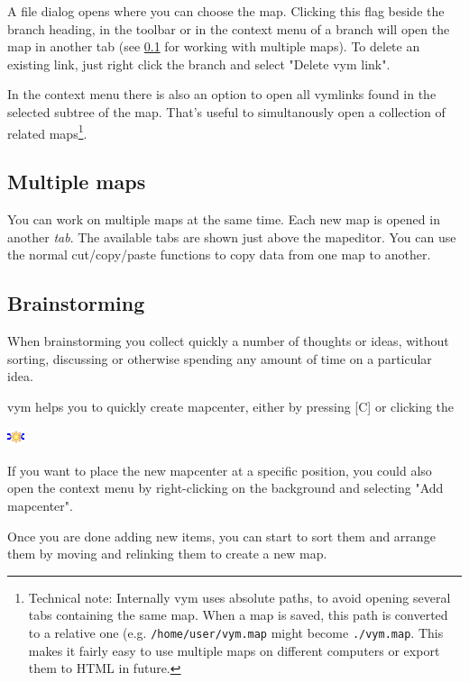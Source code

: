 \documentclass[12pt,a4paper]{article}
\newcommand{\vym}{{\sc vym }}
\newcommand{\key}[1]{[#1]}
\begin{document}
A file dialog opens where you can choose the map. 
Clicking this flag beside the branch heading, in the toolbar or in the
context menu of a branch will open the map in another tab (see
\ref{tabs} for working with multiple maps). To delete an existing link,
just right click the branch and select "Delete \vym link".

In the context menu there is also an option to open all vymlinks found
in the selected subtree of the map. That's useful to simultanously open
a collection of related maps\footnote{
    Technical note: Internally \vym uses absolute paths, to avoid
    opening several tabs containing the same map. When a map is saved,
    this path is converted to a relative one 
    (e.g. {\tt /home/user/vym.map} might become {\tt ./vym.map}. This
    makes it fairly easy to use multiple maps on different computers or
    export them to HTML in future.}.


\subsection{Multiple maps} \label{tabs}
You can work on multiple maps at the same time. Each new map is opened
in another {\em tab}. The available tabs are shown just above the
mapeditor. You can use the normal cut/copy/paste functions to
copy data from one map to another.

\subsection{Brainstorming} \label{brainstorming}
When brainstorming you collect quickly a number of thoughts or ideas,
without sorting, discussing or otherwise spending any amount of time on
a particular idea.

\vym helps you to quickly create mapcenter, either by pressing \key{C}
or clicking the 
    \begin{center}
	\includegraphics[width=0.5cm]{images/newmapcenter.png}
    \end{center}
If you want to place the new  mapcenter at a specific position, you
could also open the context menu by right-clicking on the background and
selecting "Add mapcenter".

Once you are done adding new items, you can start to sort them and
arrange them by moving and relinking them to create a new map.


\end{document}

